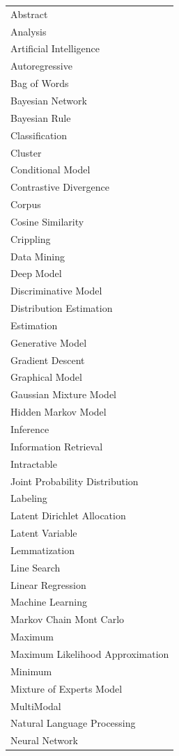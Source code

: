 \begin{table}[h]
\begin{minipage}{0.5\textwidth}
\begin{tabular}{r}
	\end{tabular}
\end{minipage}
\begin{minipage}[c]{0.5\textwidth}
\begin{latin}	
	\begin{tabular}{l}
		Abstract \\ 
		Analysis\\ 
		Artificial Intelligence\\ 
		Autoregressive\\ 
		Bag of Words\\ 
		Bayesian Network\\ 
		Bayesian Rule\\ 
		Classification\\ 
		Cluster\\ 
		Conditional Model\\ 
		Contrastive Divergence\\ 
		Corpus\\ 
		Cosine Similarity\\ 
		Crippling\\ 
		Data Mining\\ 
		Deep Model\\ 
		Discriminative Model\\ 
		Distribution Estimation\\ 
		Estimation\\ 
		Generative Model\\ 
		Gradient Descent\\ 
		Graphical Model\\ 
		Gaussian Mixture Model\\ 
		Hidden Markov Model\\ 
		Inference\\ 
		Information Retrieval\\ 
		Intractable\\ 
		Joint Probability Distribution\\ 
		Labeling\\ 
		Latent Dirichlet Allocation\\
		Latent Variable\\
		Lemmatization\\
		Line Search\\ 
		Linear Regression\\ 
		Machine Learning\\ 
		Markov Chain Mont Carlo\\ 
		Maximum\\ 
		Maximum Likelihood Approximation\\ 
		Minimum\\ 
		Mixture of Experts Model\\ 
		MultiModal\\ 
		Natural Language Processing\\ 
		Neural Network\\ 
	\end{tabular}
\end{latin}
\end{minipage}
\end{table}
